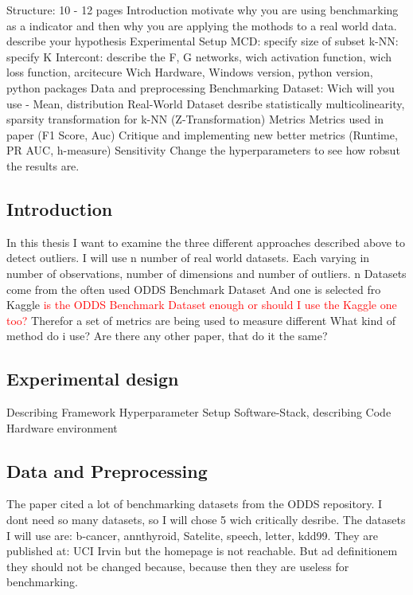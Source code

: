 Structure: 10 - 12 pages
    Introduction
       motivate why you are using benchmarking as a indicator and then why you are applying the mothods to a real world data.
       describe your hypothesis
    Experimental Setup  
        MCD: specify size of subset 
        k-NN: specify K
        Intercont: describe the F, G networks, wich activation function, wich loss function, arcitecure
        Wich Hardware, Windows version, python version, python packages
    Data and preprocessing
        Benchmarking Dataset:
            Wich will you use - Mean, distribution 
        Real-World Dataset  
            desribe statistically multicolinearity, sparsity
        transformation for k-NN (Z-Transformation)
    Metrics 
        Metrics used in paper (F1 Score, Auc)
        Critique and implementing new better metrics (Runtime, PR AUC, h-measure)
    Sensitivity
        Change the hyperparameters to see how robsut the results are. 

\subsection{Introduction}
In this thesis I want to examine the three different approaches described above to detect outliers.
I will use n number of real world datasets. 
Each varying in number of observations, number of dimensions and number of outliers.
n Datasets come from the often used ODDS Benchmark Dataset \citep{Rayana:2016}
And one is selected fro Kaggle \textcolor{red}{is the ODDS Benchmark Dataset enough or should I use the Kaggle one too?}
Therefor a set of metrics are being used to measure different 
What kind of method do i use?
Are there any other paper, that do it the same?


\subsection{Experimental design}
Describing Framework
Hyperparameter Setup
Software-Stack, describing Code
Hardware environment


\subsection{Data and Preprocessing}
The paper cited a lot of benchmarking datasets from the ODDS repository. 
I dont need so many datasets, so I will chose 5 wich critically desribe.
The datasets I will use are: b-cancer, annthyroid, Satelite, speech, letter, kdd99. 
They are published at: UCI Irvin but the homepage is not reachable. 
But ad definitionem they should not be changed because, because then they are useless for benchmarking.

